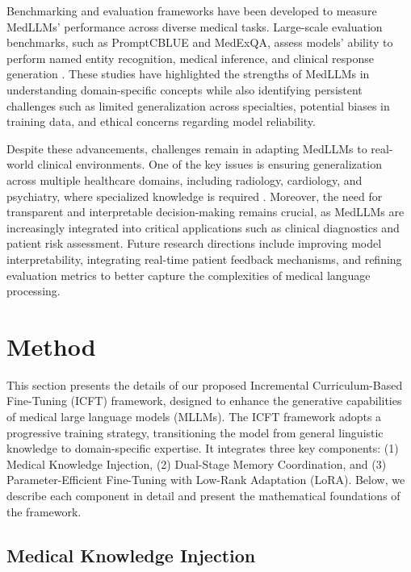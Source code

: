 Benchmarking and evaluation frameworks have been developed to measure MedLLMs' performance across diverse medical tasks. Large-scale evaluation benchmarks, such as PromptCBLUE and MedExQA, assess models' ability to perform named entity recognition, medical inference, and clinical response generation \cite{Zhu2023,Kim2024}. These studies have highlighted the strengths of MedLLMs in understanding domain-specific concepts while also identifying persistent challenges such as limited generalization across specialties, potential biases in training data, and ethical concerns regarding model reliability.

Despite these advancements, challenges remain in adapting MedLLMs to real-world clinical environments. One of the key issues is ensuring generalization across multiple healthcare domains, including radiology, cardiology, and psychiatry, where specialized knowledge is required \cite{Panagoulias2024}. Moreover, the need for transparent and interpretable decision-making remains crucial, as MedLLMs are increasingly integrated into critical applications such as clinical diagnostics and patient risk assessment. Future research directions include improving model interpretability, integrating real-time patient feedback mechanisms, and refining evaluation metrics to better capture the complexities of medical language processing.





\section{Method}

This section presents the details of our proposed Incremental Curriculum-Based Fine-Tuning (ICFT) framework, designed to enhance the generative capabilities of medical large language models (MLLMs). The ICFT framework adopts a progressive training strategy, transitioning the model from general linguistic knowledge to domain-specific expertise. It integrates three key components: (1) Medical Knowledge Injection, (2) Dual-Stage Memory Coordination, and (3) Parameter-Efficient Fine-Tuning with Low-Rank Adaptation (LoRA). Below, we describe each component in detail and present the mathematical foundations of the framework.

\subsection{Medical Knowledge Injection}

